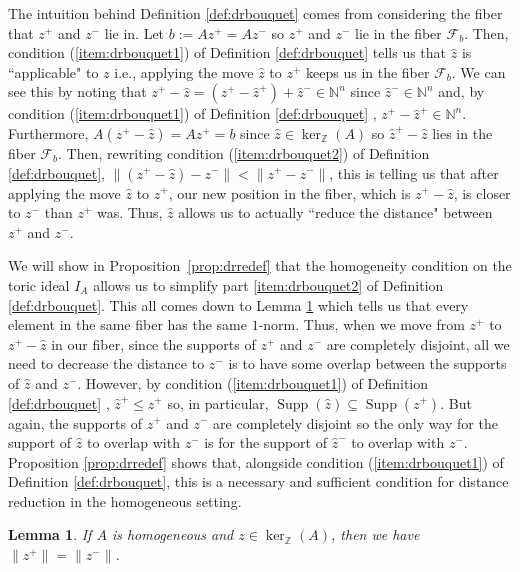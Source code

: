 \documentclass[a4paper, 12pt]{article}
\newcommand{\NN}{\mathbb N}
\newcommand{\ZZ}{\mathbb Z}
\theoremstyle{plain}
\newtheorem{lemma}[theorem]{Lemma}
\theoremstyle{definition}
\theoremstyle{remark}
\begin{document}
The intuition behind Definition \ref{def:drbouquet} comes from considering the fiber that $z^+$ and $z^-$ lie in. Let $b:=A z^+=Az^-$ so $z^+$ and $z^-$ lie in the fiber $\mathcal{F}_b$. Then, condition (\ref{item:drbouquet1}) of Definition \ref{def:drbouquet} tells us that $\hat z$ is ``applicable" to $z$ i.e., applying the move $\hat z$ to $z^+$ keeps us in the fiber $\mathcal{F}_b$. We can see this by noting that $z^+-\hat z=(z^+-\hat z^+)+\hat z^- \in \NN^n$ since $\hat z^- \in \NN^n$ and, by condition (\ref{item:drbouquet1}) of Definition \ref{def:drbouquet} , $z^+-\hat z^+ \in \NN^n$. Furthermore, $A(z^+-\hat z)=A z^+=b$ since $\hat z \in \ker_\ZZ(A)$ so $\hat z^+-\hat z$ lies in the fiber $\mathcal{F}_b$. Then, rewriting condition (\ref{item:drbouquet2}) of Definition \ref{def:drbouquet}, $\lVert (z^+-\hat z)-z^-\rVert<\lVert z^+ - z^-\rVert$, this is telling us that after applying the move $\hat z$ to $z^+$, our new position in the fiber, which is $z^+-\hat z$, is closer to $z^-$ than $z^+$ was. Thus, $\hat z$ allows us to actually ``reduce the distance" between $z^+$ and $z^-$.


We will show in Proposition~\ref{prop:drredef} that the homogeneity condition on the toric ideal $I_A$ allows us to simplify part \ref{item:drbouquet2} of Definition \ref{def:drbouquet}. This all comes down to Lemma \ref{lem:hompm} which tells us that every element in the same fiber has the same $1$-norm. Thus, when we move from $z^+$ to $z^+-\hat z$ in our fiber, since the supports of $z^+$ and $z^-$ are completely disjoint, all we need to decrease the distance to $z^-$ is to have some overlap between the supports of $\hat z$ and $z^-$. However, by condition (\ref{item:drbouquet1}) of Definition \ref{def:drbouquet} , $\hat z^+ \le z^+$ so, in particular, $\operatorname{Supp}(\hat z) \subseteq \operatorname{Supp}(z^+)$. But again, the supports of $z^+$ and $z^-$ are completely disjoint so the only way for the support of $\hat z$ to overlap with $z^-$ is for the support of $\hat z^-$ to overlap with $z^-$. Proposition \ref{prop:drredef} shows that, alongside condition (\ref{item:drbouquet1}) of Definition \ref{def:drbouquet}, this is a necessary and sufficient condition for distance reduction in the homogeneous setting.

\begin{lemma} \label{lem:hompm}
    If $A$ is homogeneous and $z \in \ker_\ZZ(A)$, then we have $\lVert z^+ \rVert= \lVert z^- \rVert$.
\end{lemma}
\end{document}
